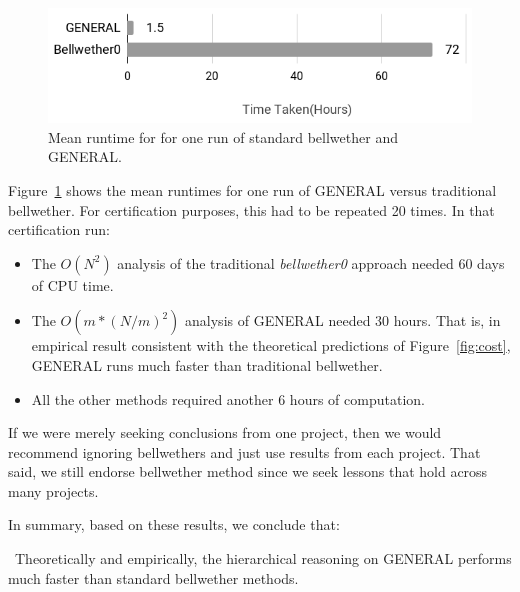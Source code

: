 \documentclass[10pt,journal,compsoc]{IEEEtran}
\newcommand{\fig}[1]{Figure~\ref{fig:#1}}
\newcommand{\bi}{\begin{itemize}}
\newcommand{\ei}{\end{itemize}}
\newenvironment{RQ}[1]%
{\noindent\begin{minipage}[c]{\linewidth}%
\begin{bclogo}[couleur=gray!20,%
                arrondi=0.1,logo=\bctrombone,%
                ombre=true%
                ]{{\small  ~#1}}}%
{\end{bclogo}\vspace{2mm}\end{minipage}}
\begin{document}
\begin{figure}[!b]
    \centering
    \includegraphics[width=\linewidth]{figs/Time.png}
    \caption{Mean runtime for for one run of standard bellwether and GENERAL.}
    \label{fig:time}
\end{figure}


\fig{time} shows the mean runtimes for one run of GENERAL versus traditional bellwether. For certification purposes, this had to be repeated 20 times. In that certification run:
\bi
\item
The $O(N^2)$ analysis of the traditional {\em bellwether0} approach needed 60 days of CPU time.
\item 
The $O(m*(N/m)^2)$ analysis
of GENERAL needed 30  hours. That is, in empirical
 result consistent with the theoretical predictions of \fig{cost}, GENERAL runs much faster than traditional bellwether.
\item All the other methods required
another 6 hours of computation. 
\ei
If we were merely seeking conclusions from one project, then we would recommend ignoring bellwethers
and just use results from each project. That said, we still endorse bellwether method since  we seek
lessons that hold across many projects.

In summary, based on these results, we conclude that:


\begin{RQ}{Theoretically and empirically, the  hierarchical reasoning on GENERAL performs much faster than standard bellwether methods.}
\end{RQ}
\end{document}
